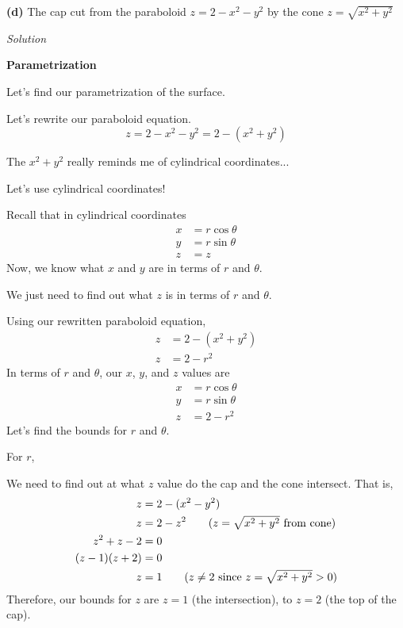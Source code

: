\documentclass{article}
\newcommand{\Solution}{\textit{Solution}}
\begin{document}
{}\textbf{(d)} The cap cut from the paraboloid $z=2-x^2-y^2$ by the cone $z=\sqrt{x^2+y^2}$

\Solution

{}\textbf{Parametrization}

Let's find our parametrization of the surface.

Let's rewrite our paraboloid equation.
\begin{equation*}
    z=2-x^2-y^2=2-(x^2+y^2)
\end{equation*}

The $x^2+y^2$ really reminds me of cylindrical coordinates...

Let's use cylindrical coordinates!

Recall that in cylindrical coordinates
\begin{align*}
    x&=r\cos\theta\\
    y&=r\sin\theta\\
    z&=z
\end{align*}
Now, we know what $x$ and $y$ are in terms of $r$ and $\theta$.

We just need to find out what $z$ is in terms of $r$ and $\theta$.

Using our rewritten paraboloid equation,
\begin{align*}
    z&=2-(x^2+y^2)\\
    z&=2-r^2\tag{in polar, $x^2+y^2=1$}
\end{align*}
In terms of $r$ and $\theta$, our $x$, $y$, and $z$ values are
\begin{align*}
    x&=r\cos\theta\\
    y&=r\sin\theta\\
    z&=2-r^2
\end{align*}
Let's find the bounds for $r$ and $\theta$.

For $r$,

We need to find out at what $z$ value do the cap and the cone intersect. That is,
\begin{align*}
   z&= 2-(x^2-y^2)\\
   z&=2-z^2\tag{$z=\sqrt{x^2+y^2}$ from cone}\\
   z^2+z-2&=0\\
   (z-1)(z+2)&=0\\
   z&=1\tag{$z\neq 2$ since $z=\sqrt{x^2+y^2}>0$}
\end{align*}
Therefore, our bounds for $z$ are $z=1$ (the intersection), to $z=2$ (the top of the cap).
\end{document}
